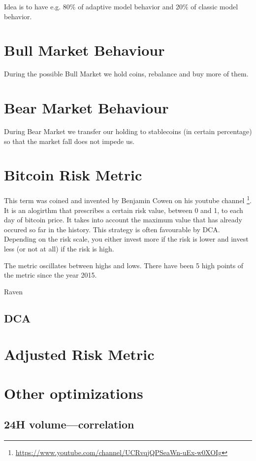 Idea is to have e.g. 80\% of adaptive model behavior and 20\% of classic model behavior.

\section{Bull Market Behaviour}
During the possible Bull Market we hold coins, rebalance and buy more of them.

\section{Bear Market Behaviour}
During Bear Market we transfer our holding to stablecoins (in certain percentage) so that the market fall does not impede us.

\section{Bitcoin Risk Metric}
This term was coined and invented by Benjamin Cowen on his youtube channel \footnote{\url{https://www.youtube.com/channel/UCRvqjQPSeaWn-uEx-w0XOIg}}. It is an alogirthm that prescribes a certain risk value, between 0 and 1, to each day of bitcoin price. It takes into account the maximum value that has already occured so far in the history. This strategy is often favourable by DCA. Depending on the risk scale, you either invest more if the risk is lower and invest less (or not at all) if the risk is high.

The metric oscillates between highs and lows. There have been 5 high points of the metric since the year 2015.

Raven

\subsection*{DCA}
\label{DCA}

\section{Adjusted Risk Metric}

\section{Other optimizations}

\subsection*{24H volume---correlation}

